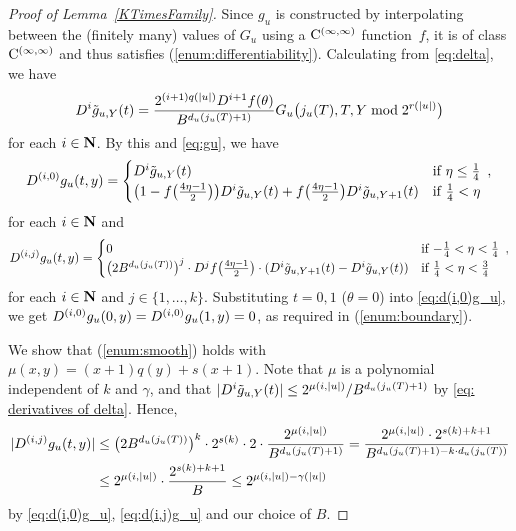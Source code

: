 \begin{proof}[Proof of Lemma~\ref{KTimesFamily}]
Since $g _u$ is constructed by interpolating between 
the (finitely many) values of $G _u$ 
using a $\mathrm C^{(\infty, \infty)}$ function~$f$, 
it is of class $\mathrm C^{(\infty, \infty)}$ 
and thus satisfies (\ref{enum:differentiability}).
Calculating from \eqref{eq:delta}, 
we have 
\begin{equation}
 \label{eq: derivatives of delta}
    D^i \tilde g_{u,Y}(t) 
    = \frac{2^{(i+1)q(|u|)} D^{i+1}f(\theta)}{B^{d_u(j_u(T)+1)}}
    G_u\bigl( j_u(T), T, Y \bmod 2^{r(|u|)} \bigr) 
\end{equation}
for each $i \in \mathbf N$. 
By this and \eqref{eq:gu}, 
we have
\begin{equation}
     D^{(i, 0)} g_u(t, y)
     = \begin{cases}
 	D^i \tilde g_{u, Y}(t) 
	& \text{if} \ \eta \le \frac 1 4 \enspace , 
	\\
	\bigl( 1-f \bigl( \frac{4\eta-1}{2} \bigr) \bigr) 
	D^i \tilde g_{u, Y}(t)
	+ f \bigl( \frac{4\eta-1}{2} \bigr) D^i \tilde g_{u,Y+1}(t) 
	& \text{if} \ \frac 1 4 < \eta 
       \end{cases} \label{eq:d(i,0)g_u}
\end{equation}
for each $i \in \mathbf N$ and 
  \begin{equation} \label{eq:d(i,j)g_u}
    D^{(i, j)} g_u(t, y)
     = \begin{cases}
	0 & \text{if} \ {-\frac 1 4} < \eta < \frac 1 4 \enspace , \\
	\bigl( 2B^{d_u(j_u(T))} \bigr)^j \cdot D^j f \bigl( \frac{4\eta - 1}2 \bigr) \cdot
	(D^i \tilde g_{u,Y+1}(t)-D^i \tilde g_{u, Y}(t)) 
	& \text{if} \ \frac 1 4 < \eta < \frac 3 4 
       \end{cases}
  \end{equation}
for each $i \in \mathbf N$ and $j \in \{1, \dots, k\}$. 
Substituting $t = 0, 1$ ($\theta = 0$) into \eqref{eq:d(i,0)g_u},
we get $D^{(i, 0)} g_u(0,y) = D^{(i, 0)} g_u(1,y) = 0$, 
as required in (\ref{enum:boundary}).

We show that (\ref{enum:smooth}) holds with $\mu(x, y) = (x+1)q(y) + s(x+1)$.
Note that $\mu$ is a polynomial independent of $k$ and $\gamma$, 
and that $
 |D^i \tilde g_{u,Y}(t)| 
\leq
 2 ^{\mu (i, \lvert u \rvert)} / B ^{d _u (j _u (T) + 1)}
$ by \eqref{eq: derivatives of delta}. 
Hence, 
\begin{align}
\label{equation: upperbound of differences}
  |D^{(i,j)} g _u (t, y)| 
&
 \le 
    \bigl( 2 B^{d_u (j _u (T))} \bigr) ^k \cdot 2^{s(k)}
   \cdot 
    2 \cdot \frac{2 ^{\mu (i, \lvert u \rvert)}}{B ^{d _u (j _u (T) + 1)}} 
 =
   \frac{2 ^{\mu (i, \lvert u \rvert)} \cdot 2^{s(k) + k + 1}}{B ^{d _u (j _u (T) + 1) - k \cdot d _u (j _u (T))}} 
\notag
\\
&
 \le
   2 ^{\mu (i, \lvert u \rvert)} \cdot \frac{2^{s(k) + k + 1}}{B}
 \le
   2^{\mu(i, |u|) - \gamma(|u|)}
\end{align}
by \eqref{eq:d(i,0)g_u}, \eqref{eq:d(i,j)g_u} and our choice of $B$.


\end{proof}
